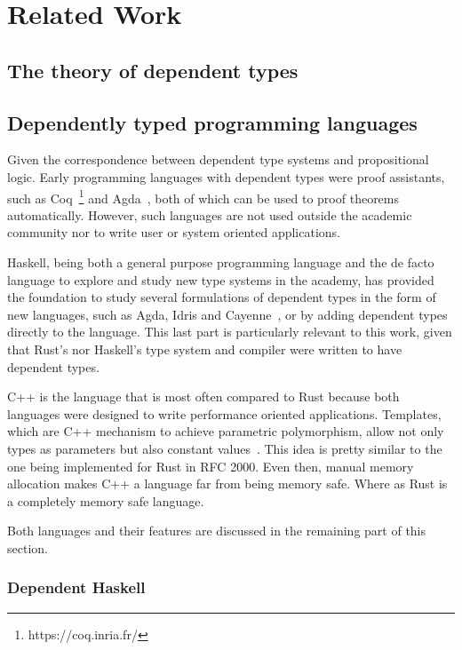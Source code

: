 \chapter{Related Work} \label{chapter:related_work}

\section{The theory of dependent types}

\section{Dependently typed programming languages}

Given the correspondence between dependent type systems and propositional logic.
Early programming languages with dependent types were proof assistants, such as
Coq~\footnote{https://coq.inria.fr/} and Agda~\cite{agda}, both of which can be
used to proof theorems automatically.  However, such languages are not used
outside the academic community nor to write user or system oriented
applications.

Haskell, being both a general purpose programming language and the de facto
language to explore and study new type systems in the academy, has provided the
foundation to study several formulations of dependent types in the form of new
languages, such as Agda, Idris \cite{idris} and Cayenne~\cite{cayenne}, or by
adding dependent types directly to the language. This last part is particularly
relevant to this work, given that Rust's nor Haskell's type system and compiler
were written to have dependent types.

C++ is the language that is most often compared to Rust because both languages
were designed to write performance oriented applications. Templates, which are
C++ mechanism to achieve parametric polymorphism, allow not only types as
parameters but also constant values~\cite{templates}. This idea is pretty
similar to the one being implemented for Rust in RFC 2000. Even then, manual
memory allocation makes C++ a language far from being memory safe. Where as Rust
is a completely memory safe language.    

Both languages and their features are discussed in the remaining part of this
section.

\subsection{Dependent Haskell} 


